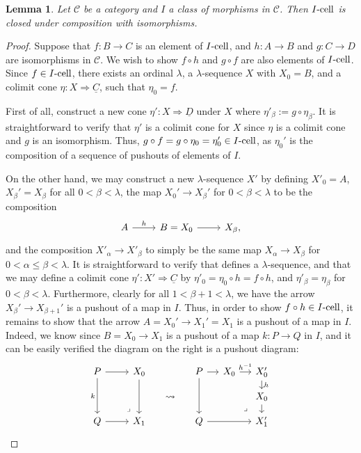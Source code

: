 \documentclass{amsart}
\theoremstyle{plain}
\newtheorem{lemma}[theorem]{Lemma}
\theoremstyle{definition}
\newcommand{\0}{\mathbf{0}}
\newcommand{\cC}{\mathcal C}
\renewcommand{\(}{\left(}
\renewcommand{\)}{\right)}
\newcommand{\cell}{\text-\mathrm{cell}}
\begin{document}
\begin{lemma}\label{I-cell_closed_under_composition_with_isomorphisms}
  Let $\cC$ be a category and $I$ a class of morphisms in $\cC$. Then $I\cell$ is closed under composition with isomorphisms.
\end{lemma}
\begin{proof}
  Suppose that $f:B\to C$ is an element of $I\cell$, and $h:A\to B$ and $g:C\to D$ are isomorphisms in $\cC$. We wish to show $f\circ h$ and $g\circ f$ are also elements of $I\cell$. Since $f\in I\cell$, there exists an ordinal $\lambda$, a $\lambda$-sequence $X$ with $X_0=B$, and a colimit cone $\eta:X\Rightarrow\underline C$, such that $\eta_0=f$. 
  
  First of all, construct a new cone $\eta':X\Rightarrow\underline D$ under $X$ where $\eta'_\beta:=g\circ\eta_\beta$. It is straightforward to verify that $\eta'$ is a colimit cone for $X$ since $\eta$ is a colimit cone and $g$ is an isomorphism. Thus, $g\circ f=g\circ\eta_0=\eta_0'\in I\cell$, as $\eta_0'$ is the composition of a sequence of pushouts of elements of $I$.

  On the other hand, we may construct a new $\lambda$-sequence $X'$ by defining $X'_0=A$, $X_\beta'=X_\beta$ for all $0<\beta<\lambda$, the map $X_0'\to X_\beta'$ for $0<\beta<\lambda$ to be the composition
  \[\begin{tikzcd}
    A & {B=X_0} & {X_\beta},
    \arrow["h", from=1-1, to=1-2]
    \arrow[from=1-2, to=1-3]
  \end{tikzcd}\]
  and the composition $X'_\alpha\to X'_\beta$ to simply be the same map $X_\alpha\to X_\beta$ for $0<\alpha\leq \beta<\lambda$. It is straightforward to verify that defines a $\lambda$-sequence, and that we may define a colimit cone $\eta':X'\Rightarrow\underline C$ by $\eta'_0=\eta_0\circ h=f\circ h$, and $\eta'_\beta=\eta_\beta$ for $0<\beta<\lambda$. Furthermore, clearly for all $1<\beta+1<\lambda$, we have the arrow $X_\beta'\to X_{\beta+1}'$ is a pushout of a map in $I$. Thus, in order to show $f\circ h\in I\cell$, it remains to show that the arrow $A=X_0'\to X_1'=X_1$ is a pushout of a map in $I$. Indeed, we know since $B=X_0\to X_1$ is a pushout of a map $k:P\to Q$ in $I$, and it can be easily verified the diagram on the right is a pushout diagram:
  \[\begin{tikzcd}[row sep=small,column sep=small]
    P && {X_0} && P & {X_0} & {X_0'} \\
    &&& \leadsto &&& {X_0} \\
    Q && {X_1} && Q && {X_1'}
    \arrow[from=1-3, to=3-3]
    \arrow[from=3-1, to=3-3]
    \arrow[from=1-1, to=1-3]
    \arrow["k"', from=1-1, to=3-1]
    \arrow["\ulcorner"{anchor=center, pos=0.125, rotate=180}, draw=none, from=3-3, to=1-1]
    \arrow[from=1-5, to=1-6]
    \arrow["h", from=1-7, to=2-7]
    \arrow[from=2-7, to=3-7]
    \arrow[from=1-5, to=3-5]
    \arrow[from=3-5, to=3-7]
    \arrow["{h^{-1}}", from=1-6, to=1-7]
    \arrow["\ulcorner"{anchor=center, pos=0.125, rotate=180}, draw=none, from=3-7, to=1-5]
  \end{tikzcd}\qedhere\]
\end{proof}
\end{document}
